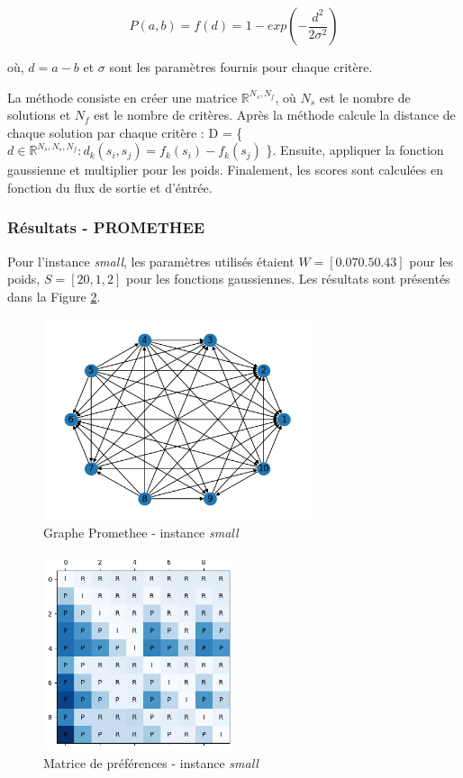 \documentclass[12pt, a4paper, french, version=last, parskip=half, titlepage]{scrartcl}
\begin{document}
\begin{equation}
    P(a, b) = f(d) = 1 - exp(-\frac{d^2}{2\sigma^2})
\end{equation}

où, $d = a - b$ et $\sigma$ sont les paramètres fournis pour chaque critère.

La méthode consiste en créer une matrice $\mathbb{R}^{N_s, N_f}$, où $N_s$ est le nombre de solutions et $N_f$ est le nombre de critères. Après la méthode calcule la distance de chaque solution par chaque critère : D = \{$d \in \mathbb{R}^{N_s,N_s,N_f} : d_k(s_i, s_j) = f_k(s_i) - f_k(s_j)$ \}. Ensuite, appliquer la fonction gaussienne et multiplier pour les poids. Finalement, les scores sont calculées en fonction du flux de sortie et d'éntrée.


\subsubsection{Résultats - PROMETHEE}

Pour l'instance \emph{small}, les paramètres utilisés étaient $W = [0.07 0.5 0.43]$ pour les poids, $S = [20, 1, 2]$ pour les fonctions gaussiennes. Les résultats sont présentés dans la Figure \ref{fig:graph+somme_ponderee}.

\begin{figure}[H]
\centering
\includegraphics[width=0.7\textwidth]{images/promethee_graph.png}
\caption{Graphe Promethee - instance \emph{small}}
\label{fig:graph+somme_ponderee}
\end{figure}    


\begin{figure}[H]
\centering
\includegraphics[width=0.5\textwidth]{images/promethee_preference_matrix.png}
\caption{Matrice de préférences - instance \emph{small}}
\label{fig:graph+somme_ponderee}
\end{figure}    
\end{document}
